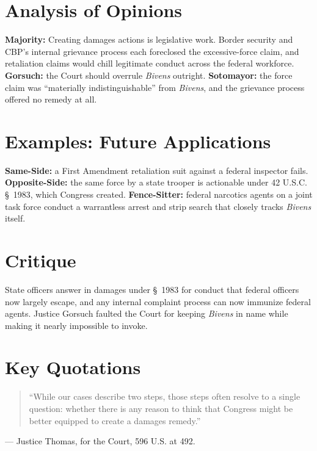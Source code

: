 \documentclass[12pt]{article}
\begin{document}
\section{Analysis of Opinions}
\textbf{Majority:} Creating damages actions is legislative work. Border security and CBP's internal grievance process each foreclosed the excessive-force claim, and retaliation claims would chill legitimate conduct across the federal workforce. \textbf{Gorsuch:} the Court should overrule \textit{Bivens} outright. \textbf{Sotomayor:} the force claim was ``materially indistinguishable'' from \textit{Bivens}, and the grievance process offered no remedy at all.

\section{Examples: Future Applications}
\textbf{Same-Side:} a First Amendment retaliation suit against a federal inspector fails. \textbf{Opposite-Side:} the same force by a state trooper is actionable under 42 U.S.C. \S~1983, which Congress created. \textbf{Fence-Sitter:} federal narcotics agents on a joint task force conduct a warrantless arrest and strip search that closely tracks \textit{Bivens} itself.

\section{Critique}
State officers answer in damages under \S~1983 for conduct that federal officers now largely escape, and any internal complaint process can now immunize federal agents. Justice Gorsuch faulted the Court for keeping \textit{Bivens} in name while making it nearly impossible to invoke.

\section{Key Quotations}
\begin{quote}
``While our cases describe two steps, those steps often resolve to a single question: whether there is any reason to think that Congress might be better equipped to create a damages remedy.''
\end{quote}
\noindent --- Justice Thomas, for the Court, 596 U.S. at 492.
\end{document}

